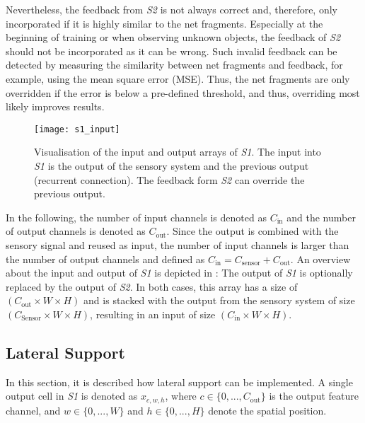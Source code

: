 Nevertheless, the feedback from \emph{S2} is not always correct and, therefore, only incorporated if it is highly similar to the net fragments. Especially at the beginning of training or when observing unknown objects, the feedback of \emph{S2} should not be incorporated as it can be wrong.
Such invalid feedback can be detected by measuring the similarity between net fragments and feedback, for example, using the mean square error (MSE). Thus, the net fragments are only overridden if the error is below a pre-defined threshold, and thus, overriding most likely improves results.

\begin{figure}[h]
    \centering
    \texttt{[image: s1\_input]}
    \caption[Input and output of \emph{S1}]{Visualisation of the input and output arrays of \emph{S1}. The input into \emph{S1} is the output of the sensory system and the previous output (recurrent connection). The feedback form \emph{S2} can override the previous output.}
\end{figure}


In the following, the number of input channels is denoted as $C_{\text{in}}$ and the number of output channels is denoted as $C_{\text{out}}$. Since the output is combined with the sensory signal and reused as input, the number of input channels is larger than the number of output channels and defined as $C_{\text{in}} = C_{\text{sensor}} + C_{\text{out}}$.
An overview about the input and output of \emph{S1} is depicted in :
The output of \emph{S1} is optionally replaced by the output of \emph{S2}. In both cases, this array has a size of $(C_{\text{out}} \times W \times H)$ and is stacked with the output from the sensory system of size $(C_{\text{Sensor}} \times W \times H)$, resulting in an input of size $(C_{\text{in}} \times W \times H)$.


\subsection{Lateral Support}
In this section, it is described how lateral support can be implemented.
A single output cell in \emph{S1} is denoted as $x_{c,w,h}$, where $c \in \{0, ..., C_{\text{out}}\}$ is the output feature channel, and $w \in \{0, ..., W\}$ and $h \in \{0, ..., H\}$ denote the spatial position.

